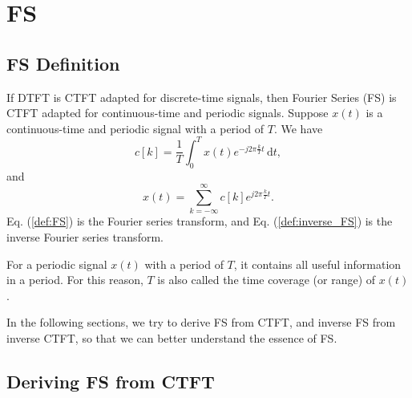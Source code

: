 \documentclass[journal,twoside]{IEEEtran}
\newcommand{\dd}{\,\mathrm{d}}
\begin{document}
\section{FS}
\label{sec:FS}

\subsection{FS Definition}

If DTFT is CTFT adapted for discrete-time signals, then Fourier Series (FS) is CTFT adapted for continuous-time and periodic signals. Suppose $x(t)$ is a continuous-time and periodic signal with a period of $T$. We have
\begin{equation}
c[k]=\frac{1}{T}\int_{0}^{T}x(t)e^{-j2\pi\frac{k}{T}t}\dd t,\label{def:FS}
\end{equation}
and
\begin{equation}
x(t)=\sum_{k=-\infty}^{\infty}c[k]e^{j2\pi\frac{k}{T}t}.\label{def:inverse_FS}
\end{equation}
Eq. (\ref{def:FS}) is the Fourier series transform, and Eq. (\ref{def:inverse_FS}) is the inverse Fourier series transform.

For a periodic signal $x(t)$ with a period of $T$, it contains all useful information in a period. For this reason, $T$ is also called the time coverage (or range) of $x(t)$. 

In the following sections, we try to derive FS from CTFT, and inverse FS from inverse CTFT, so that we can better understand the essence of FS.

\subsection{Deriving FS from CTFT}
\end{document}
